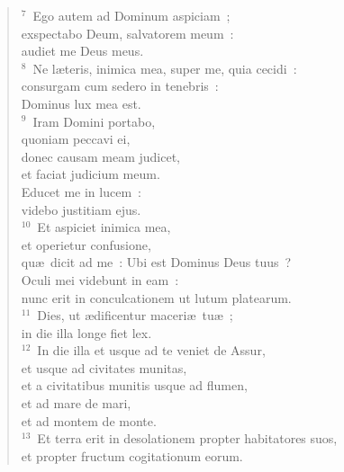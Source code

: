 \begin{verse}${}^{7}$~Ego autem ad Dominum aspiciam~;\\ exspectabo Deum, salvatorem meum~:\\ audiet me Deus meus.\\
${}^{8}$~Ne l\ae teris, inimica mea, super me, quia cecidi~:\\ consurgam cum sedero in tenebris~:\\ Dominus lux mea est.\\
${}^{9}$~Iram Domini portabo,\\ quoniam peccavi ei,\\ donec causam meam judicet,\\ et faciat judicium meum.\\ Educet me in lucem~:\\ videbo justitiam ejus.\\
${}^{10}$~Et aspiciet inimica mea,\\ et operietur confusione,\\ qu\ae\ dicit ad me~: Ubi est Dominus Deus tuus~?\\ Oculi mei videbunt in eam~:\\ nunc erit in conculcationem ut lutum platearum.\\
${}^{11}$~Dies, ut \ae dificentur maceri\ae\ tu\ae~;\\ in die illa longe fiet lex.\\
${}^{12}$~In die illa et usque ad te veniet de Assur,\\ et usque ad civitates munitas,\\ et a civitatibus munitis usque ad flumen,\\ et ad mare de mari,\\ et ad montem de monte.\\
${}^{13}$~Et terra erit in desolationem propter habitatores suos,\\ et propter fructum cogitationum eorum.\end{verse}


